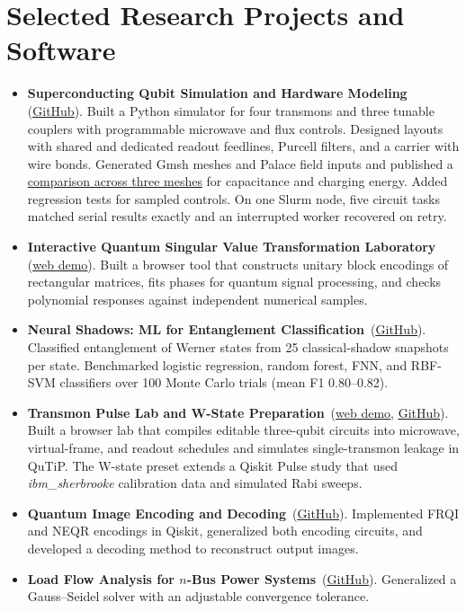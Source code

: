 \documentclass[letterpaper,11pt]{article}
\newcommand{\cvlink}[2]{\href{#1}{\underline{#2}}}
\begin{document}
\section{Selected Research Projects and Software}
\begin{itemize}
  \item \textbf{Superconducting Qubit Simulation and Hardware Modeling} \,(\cvlink{https://github.com/syedshubha/EmulateQPU-4Q}{GitHub}).
        Built a Python simulator for four transmons and three tunable couplers with programmable microwave and flux controls. Designed layouts with shared and dedicated readout feedlines, Purcell filters, and a carrier with wire bonds. Generated Gmsh meshes and Palace field inputs and published a \cvlink{https://github.com/syedshubha/EmulateQPU-4Q/tree/main/reproducibility/mesh-ladder}{comparison across three meshes} for capacitance and charging energy. Added regression tests for sampled controls. On one Slurm node, five circuit tasks matched serial results exactly and an interrupted worker recovered on retry.
  \item \textbf{Interactive Quantum Singular Value Transformation Laboratory} \,(\cvlink{https://syedshubha.com/qsvt/}{web demo}). Built a browser tool that constructs unitary block encodings of rectangular matrices, fits phases for quantum signal processing, and checks polynomial responses against independent numerical samples.
  \item \textbf{Neural Shadows: ML for Entanglement Classification} \,(\cvlink{https://github.com/syedshubha/ShadowTomography}{GitHub}).
        Classified entanglement of Werner states from 25 classical-shadow snapshots per state. Benchmarked logistic regression, random forest, FNN, and RBF-SVM classifiers over 100 Monte Carlo trials (mean F1 0.80--0.82).
  \item \textbf{Transmon Pulse Lab and W-State Preparation} \,(\cvlink{https://syedshubha.com/transmon/}{web demo}, \cvlink{https://github.com/syedshubha/w-state-qiskit-pulse}{GitHub}).
        Built a browser lab that compiles editable three-qubit circuits into microwave, virtual-frame, and readout schedules and simulates single-transmon leakage in QuTiP. The W-state preset extends a Qiskit Pulse study that used \textit{ibm\_sherbrooke} calibration data and simulated Rabi sweeps.
  \item \textbf{Quantum Image Encoding and Decoding} \,(\cvlink{https://github.com/syedshubha/QuantumImageProcessing/blob/main/NEQR_FRQI.ipynb}{GitHub}).
        Implemented FRQI and NEQR encodings in Qiskit, generalized both encoding circuits, and developed a decoding method to reconstruct output images.
  \item \textbf{Load Flow Analysis for $n$-Bus Power Systems} \,(\cvlink{https://github.com/syedshubha/load_flow_analysis_gauss_seidel}{GitHub}).
        Generalized a Gauss--Seidel solver with an adjustable convergence tolerance.
\end{itemize}
\end{document}
